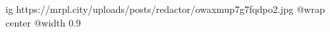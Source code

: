  
 
 
 
 

\ifcmt
  ig https://mrpl.city/uploads/posts/redactor/owaxmup7g7fqdpo2.jpg
  @wrap center
  @width 0.9
\fi
